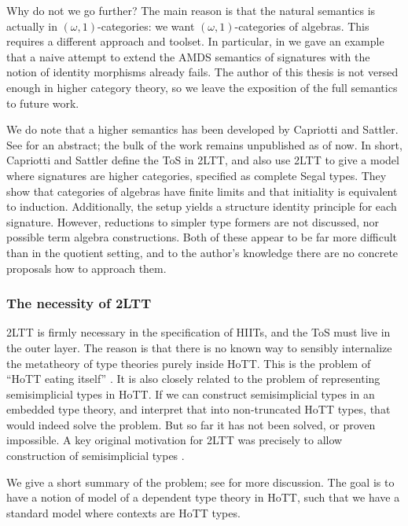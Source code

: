 \documentclass[12pt,a4paper,twoside,openany]{book}
\theoremstyle{remark}
\theoremstyle{definition}
\theoremstyle{theorem}
\begin{document}
Why do not we go further? The main reason is that the natural semantics is
actually in $(\omega,1)$-categories: we want $(\omega,1)$-categories of
algebras. This requires a different approach and toolset. In particular, in
\cite[Section~9]{hiits} we gave an example that a naive attempt to extend the AMDS
semantics of signatures with the notion of identity morphisms already fails.
The author of this thesis is not versed enough in higher category theory, so we
leave the exposition of the full semantics to future work.

We do note that a higher semantics has been developed by Capriotti and
Sattler. See \cite{capriotti2020higher} for an abstract; the bulk of the work
remains unpublished as of now. In short, Capriotti and Sattler define the ToS in
2LTT, and also use 2LTT to give a model where signatures are higher categories,
specified as complete Segal types. They show that categories of algebras have
finite limits and that initiality is equivalent to induction. Additionally, the
setup yields a structure identity principle for each signature. However,
reductions to simpler type formers are not discussed, nor possible term algebra
constructions. Both of these appear to be far more difficult than in the
quotient setting, and to the author's knowledge there are no concrete proposals
how to approach them.

\subsubsection{The necessity of 2LTT}

2LTT is firmly necessary in the specification of HIITs, and the ToS must live in
the outer layer. The reason is that there is no known way to sensibly
internalize the metatheory of type theories purely inside HoTT. This is the
problem of ``HoTT eating itself'' \cite{hott-eat-itself}. It is also closely
related to the problem of representing semisimplicial types in HoTT. If we can
construct semisimplicial types in an embedded type theory, and interpret that
into non-truncated HoTT types, that would indeed solve the problem. But so far
it has not been solved, or proven impossible. A key original motivation for 2LTT
was precisely to allow construction of semisimplicial types \cite{twolevel}.

We give a short summary of the problem; see \cite[Section~4]{hiits} for more
discussion. The goal is to have a notion of model of a dependent type theory in
HoTT, such that we have a standard model where contexts are HoTT types.
\end{document}
